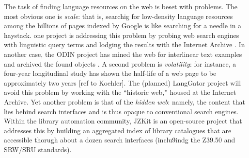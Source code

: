 The task of finding language resources on the web is beset with
problems.  The most obvious one is \emph{scale}: that is, searchig for
low-density language resources among the billions of pages indexed
by Google is like searching for a needle in a haystack. one project is
addressing this problem by probing web search engines with linguistic
query terms and lodging the results with the Internet Archive
\citep{BaldwinBird06}. In another case, the ODIN project has mined
the web for interlinear text examples and archived the found objects
\citep{Langendoen02,Lewis03}.  A second problem is \emph{volatility}:
for instance, a four-year longitudinal study has shown the half-life
of a web page to be approximately two years [ref to Koehler].
The (planned) LangGator project will avoid this problem by working
with the ``historic web,'' housed at the Internet Archive.  Yet
another problem is that of the
\emph{hidden web}: namely, the content that lies behind search
interfaces and is thus opaque to conventional search engines.
Within the library automation community, JZKit is an open-source project
that addresses this by building an aggregated index of library
catalogues that are accessible thorugh about a dozen search interfaces
(inclu9indg the Z39.50 and SRW/SRU standards).


